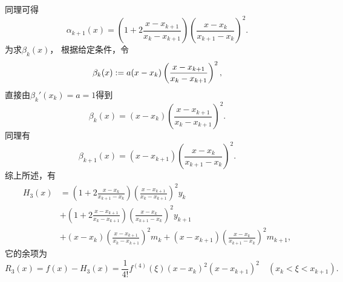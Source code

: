 同理可得\begin{equation}\label{equation:厄米插值.厄米插值基函数2}
	\alpha_{k+1}(x)
	= \left( 1 + 2 \frac{x - x_{k+1}}{x_k - x_{k+1}} \right)
	\left( \frac{x - x_k}{x_{k+1} - x_k} \right)^2.
\end{equation}
为求\(\beta_k(x)\)，
根据给定条件，令\begin{equation*}
	\beta_k(x)
	:=
	a (x-x_k)
	\left( \frac{x - x_{k+1}}{x_k - x_{k+1}} \right)^2,
\end{equation*}
直接由\(\beta_k'(x_k) = a = 1\)得到\begin{equation}\label{equation:厄米插值.厄米插值基函数3}
	\beta_k(x)
	= (x-x_k)
	\left( \frac{x - x_{k+1}}{x_k - x_{k+1}} \right)^2.
\end{equation}
同理有\begin{equation}\label{equation:厄米插值.厄米插值基函数4}
	\beta_{k+1}(x)
	= (x-x_{k+1})
	\left( \frac{x - x_k}{x_{k+1} - x_k} \right)^2.
\end{equation}
综上所述，有\begin{equation}\label{equation:厄米插值.两点三次厄米插值多项式}
	\begin{aligned}
		H_3(x)
		&= \left( 1 + 2 \frac{x - x_k}{x_{k+1} - x_k} \right)
		\left( \frac{x - x_{k+1}}{x_k - x_{k+1}} \right)^2
		y_k \\
		&+ \left( 1 + 2 \frac{x - x_{k+1}}{x_k - x_{k+1}} \right)
		\left( \frac{x - x_k}{x_{k+1} - x_k} \right)^2
		y_{k+1} \\
		&+ (x - x_k)
		\left( \frac{x - x_{k+1}}{x_k - x_{k+1}} \right)^2
		m_k
		+ (x - x_{k+1})
		\left( \frac{x - x_k}{x_{k+1} - x_k} \right)^2
		m_{k+1},
	\end{aligned}
\end{equation}
它的余项为\begin{equation}\label{equation:厄米插值.两点三次厄米插值余项}
	R_3(x) = f(x) - H_3(x)
	= \frac1{4!} f^{(4)}(\xi)
	(x - x_k)^2 (x - x_{k+1})^2
	\quad(x_k < \xi < x_{k+1}).
\end{equation}
